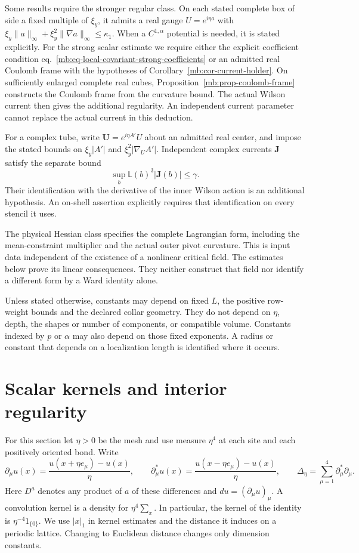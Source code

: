 \documentclass[11pt,letterpaper,reqno]{amsart}
\numberwithin{equation}{section}
\renewcommand{\eqref}[1]{\textup{eq.~\ref{#1}}}
\theoremstyle{definition}
\theoremstyle{remark}
\begin{document}
Some results require the stronger regular class. On each stated
complete box of side a fixed multiple of $\xi_y$, it admits a
real gauge $U=e^{i\eta a}$ with
$\xi_y\|a\|_\infty+\xi_y^2\|\nabla a\|_\infty\le\kappa_1$.
When a $C^{1,\alpha}$ potential is needed, it is stated explicitly.
For the strong scalar estimate we require either the explicit
coefficient condition \eqref{mb:eq-local-covariant-strong-coefficients}
or an admitted real Coulomb frame with the hypotheses of
Corollary~\ref{mb:cor-current-holder}. On sufficiently enlarged
complete real cubes, Proposition~\ref{mb:prop-coulomb-frame}
constructs the Coulomb frame from the curvature bound.
The actual Wilson current then gives the additional regularity.
An independent current parameter cannot replace the actual current
in this deduction.

For a complex tube, write $\mathbf U=e^{i\eta A'}U$ about an
admitted real center, and impose the stated bounds on
$\xi_y|A'|$ and $\xi_y^2|\nabla_UA'|$. Independent complex
currents $\mathbf J$ satisfy the separate bound
\[
                 \sup_b\mathsf L(b)^3|\mathbf J(b)|\le\gamma.
\]
Their identification with the derivative of the inner Wilson action
is an additional hypothesis.
An on-shell assertion explicitly requires that identification
on every stencil it uses.

The physical Hessian class specifies the complete Lagrangian
form, including the mean-constraint multiplier and the actual
outer pivot curvature. This is input data independent of the
existence of a nonlinear critical field. The estimates below
prove its linear consequences. They neither construct that field
nor identify a different form by a Ward identity alone.

Unless stated otherwise, constants may depend on fixed $L$,
the positive row-weight bounds and the declared collar geometry.
They do not depend on $\eta$, depth, the shapes or number of
components, or compatible volume. Constants indexed by $p$ or
$\alpha$ may also depend on those fixed exponents. A radius or
constant that depends on a localization length is identified
where it occurs.


\section{Scalar kernels and interior regularity}
\label{mb:sec-scalar}

For this section let \(\eta>0\) be the mesh and use measure
\(\eta^4\) at each site and each positively oriented bond. Write
\[
 \partial_\mu u(x)=\frac{u(x+\eta e_\mu)-u(x)}{\eta},
 \qquad
 \partial_\mu^* u(x)=\frac{u(x-\eta e_\mu)-u(x)}{\eta},
 \qquad
 \Delta_\eta=\sum_{\mu=1}^4\partial_\mu^*\partial_\mu.
\]
Here \(D^a\) denotes any product of \(a\) of these differences and
\(d u=(\partial_\mu u)_\mu\). A convolution kernel is a density for
\(\eta^4\sum_x\). In particular, the kernel of the identity is
\(\eta^{-4}1_{\{0\}}\). We use \(|x|_1\) in kernel estimates and the
distance it induces on a periodic lattice. Changing to Euclidean
distance changes only dimension constants.
\end{document}

